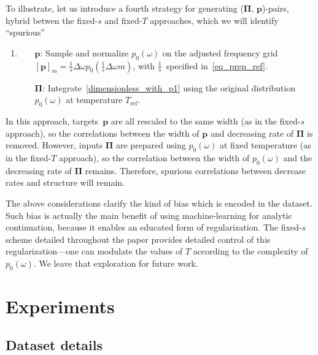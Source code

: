 \documentclass[notitlepage, 11pt, nofootinbib]{revtex4-1}
\renewcommand{\vec}[1]{\bm{#1}}
\begin{document}
To illustrate, let us introduce a fourth strategy for generating ($\vec \Pi$, $\vec p$)-pairs, hybrid betwen the fixed-$s$ and fixed-$T$ approaches, which we will identify ``spurious''
\begin{enumerate}[resume]
    \item \label{spurious}
    \begin{itemize}
        \item[$\vec p$:] Sample and normalize $p_0(\omega)$ on the adjusted frequency grid $[\vec p]_m = \frac{1}{s}\Delta\omega p_0(\frac{1}{s}\Delta\omega m)$, with $\frac{1}{s}$~specified in~\eqref{eq_prep_ref}.

        \item[$\vec \Pi$:] Integrate~\eqref{dimensionless_with_p1} using the original distribution $p_0(\omega)$ at temperature $T_{\text{ref}}$.
    \end{itemize}
\end{enumerate}
In this approach, targets~$\vec p$ are all rescaled to the same width (as in the fixed-$s$ approach), so the correlations between the width of $\vec p$ and decreasing rate of $\vec \Pi$ is removed.
However, inputs $\vec \Pi$ are prepared using $p_0(\omega)$ at fixed temperature (as in the fixed-$T$ approach), so the correlation between the width of $p_0(\omega)$ and the decreasing rate of $\vec \Pi$ remains.
Therefore, spurious correlations between decrease rates and structure will remain.

The above considerations clarify the kind of bias which is encoded in the dataset. Such bias is actually the main benefit of using machine-learning for analytic continuation, because it enables an educated form of regularization. The fixed-$s$ scheme detailed throughout the paper provides detailed control of this regularization---one can modulate the values of $T$ according to the complexity of $p_0(\omega)$. We leave that exploration for future work.

\begin{figure}
    \caption{}
    \label{fig_prep_compare}
\end{figure}

\section{Experiments}

\subsection{Dataset details}
\end{document}
